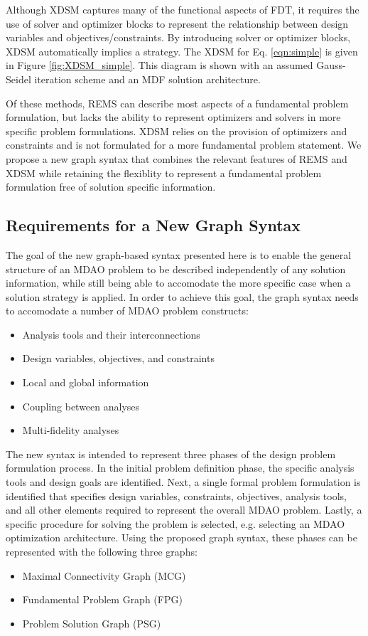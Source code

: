     Although XDSM captures many of the functional aspects of FDT, it 
    requires the use of solver and optimizer blocks to represent 
    the relationship between design variables and objectives/constraints. 
    By introducing solver or optimizer blocks, XDSM automatically implies a strategy. 
    The XDSM for Eq. \ref{eqn:simple} is 
    given in Figure \ref{fig:XDSM_simple}. This diagram is shown with an 
    assumed Gauss-Seidel iteration scheme and an MDF solution architecture. 

    Of these methods, REMS can describe most aspects of a fundamental 
    problem formulation, but lacks the ability to represent optimizers and 
    solvers in more specific problem formulations. XDSM relies on the provision of  
    optimizers and constraints and is not formulated  
    for a more fundamental problem statement. We propose a new graph syntax that 
    combines the relevant features of REMS and XDSM while retaining the flexiblity to 
    represent a fundamental problem formulation free of solution specific information. 

\subsection{Requirements for a New Graph Syntax}
  \label{s:requirements}
  The goal of the new graph-based syntax presented here is to enable the general structure of an MDAO problem to be described independently of any solution information, 
  while still being able to accomodate the more specific case when a solution 
  strategy is applied. In order to achieve this goal, 
  the graph syntax needs to accomodate a number of MDAO problem constructs: 
  \begin{itemize}
    \item Analysis tools and their interconnections
    \item Design variables, objectives, and constraints
    \item Local and global information
    \item Coupling between analyses
    \item Multi-fidelity analyses
  \end{itemize}

  The new syntax is intended to represent three phases of the design problem 
  formulation process. In the initial problem definition phase, the specific 
  analysis tools and design goals are identified. Next, a single formal problem 
  formulation is identified that specifies design variables, constraints, 
  objectives, analysis tools, and all other elements required to represent 
  the overall MDAO problem. Lastly, a specific procedure for solving the problem 
  is selected, e.g. selecting an MDAO optimization architecture. Using 
  the proposed graph syntax, these phases can be represented with the following 
  three graphs:
  \begin{itemize}
    \item Maximal Connectivity Graph (MCG)
    \item Fundamental Problem Graph (FPG)
    \item Problem Solution Graph (PSG)
  \end{itemize}

